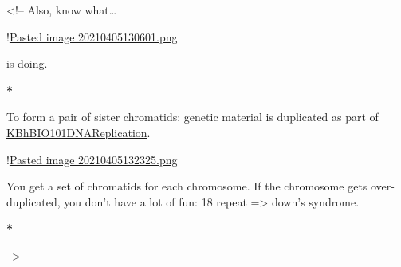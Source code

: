 \documentclass[letterpaper]{article}
\begin{document}
\begin{html}
<!--
Also, know what\ldots{}

!\href{Pasted image 20210405130601.png.org}{Pasted image 20210405130601.png}

is doing.

\textbf{*}

To form a pair of sister chromatids: genetic material is duplicated as part of \href{KBhBIO101DNAReplication.org}{KBhBIO101DNAReplication}.

!\href{Pasted image 20210405132325.png.org}{Pasted image 20210405132325.png}

You get a set of chromatids for each chromosome. If the chromosome gets over-duplicated, you don't have a lot of fun: 18 repeat => down's syndrome.

\textbf{*}

-->
\end{html}
\end{document}
